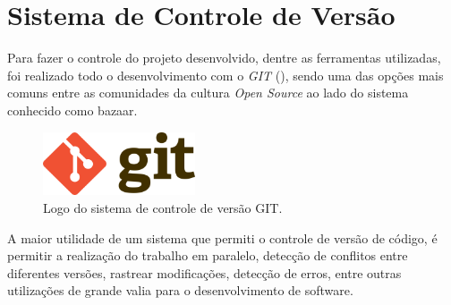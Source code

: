\section{Sistema de Controle de Versão}

Para fazer o controle do projeto desenvolvido, dentre as ferramentas utilizadas, foi realizado todo o desenvolvimento com o
\textit{GIT} (), sendo uma das opções mais comuns entre as comunidades da cultura \textit{Open Source}
ao lado do sistema conhecido como bazaar.


\begin{figure}[!htb]
  \centering
  \caption[Logo GIT]{Logo do sistema de controle de versão GIT.}
  \label{fig:gitlogo}
  \includegraphics[width=0.4\textwidth]{figuras/gitlogo.png}
\end{figure}

A maior utilidade de um sistema que permiti o controle de versão de código, é permitir a realização do trabalho em paralelo,
detecção de conflitos entre diferentes versões, rastrear modificações, detecção de erros, entre outras utilizações de grande valia
para o desenvolvimento de software.
